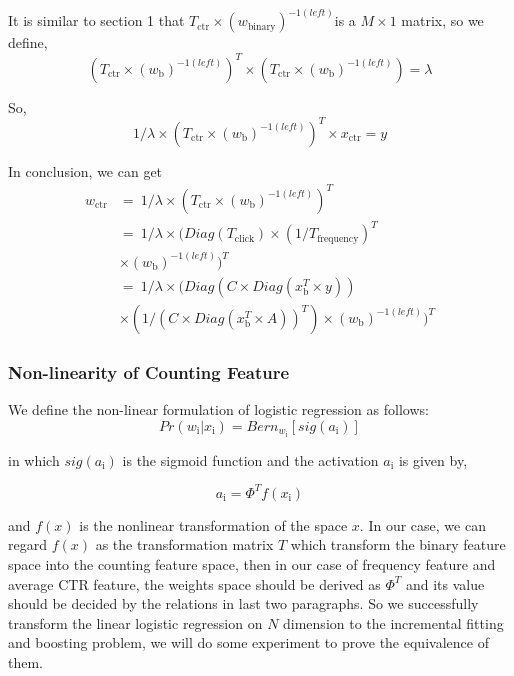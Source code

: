 \documentclass{sig-alternate}
\begin{document}
It is similar to section 1 that \(T_{\text{ctr}} \times (w_{\text{binary}})^{-1(left)}\)is a \(M \times 1\) matrix, so we define, 
\begin{equation}
(T_{\text{ctr}} \times (w_{\text{b}})^{-1(left)})^T \times (T_{\text{ctr}} \times (w_{\text{b}})^{-1(left)}) = \lambda
\end{equation}

So, 
\begin{equation}
1/{\lambda} \times (T_{\text{ctr}} \times (w_{\text{b}})^{-1(left)})^T \times x_{\text{ctr}} =  y
\end{equation}

In conclusion, we can get
\begin{equation} 
\begin{split}
w_{\text{ctr}} & =\ 1/{\lambda} \times (T_{\text{ctr}} \times (w_{\text{b}})^{-1(left)})^T \\
& = \ 1/{\lambda} \times (Diag(T_{\text{click}}) \times (1/T_{\text{frequency}} )^T \\ 
& \times (w_{\text{b}})^{-1(left)})^T \\
& = \ 1/{\lambda} \times (Diag(C \times Diag(x_{\text{b}}^T \times y)) \\ 
& \times (1/ (C \times Diag(x_{\text{b}}^T \times A) )^T) \times (w_{\text{b}})^{-1(left)})^T
\end{split}
\end{equation}

\subsubsection{Non-linearity of Counting Feature}
We define the non-linear formulation of logistic regression as follows:
\begin{equation}
Pr(w_{\text{i}}|x_{\text{i}}) = Bern_{w_{\text{i}}}[sig(a_{\text{i}})]
\end{equation}

in which \(sig(a_{\text{i}})\) is the sigmoid function and the activation \(a_{\text{i}}\) is given by,

\begin{equation}
a_{\text{i}} = \Phi^T f(x_{\text{i}})
\end{equation}

and \(f(x)\) is the nonlinear transformation of the space \(x\). 
In our case, we can regard \(f(x)\) as the transformation matrix \(T\) which transform the binary feature space into the counting feature space, then in our case of frequency feature and average CTR feature, the weights space should be derived as \(\Phi^T \) and its value should be decided by the relations in last two paragraphs. So we successfully transform the linear logistic regression on \(N\) dimension to the incremental fitting and boosting problem, we will do some experiment to prove the equivalence of them.
\end{document}
